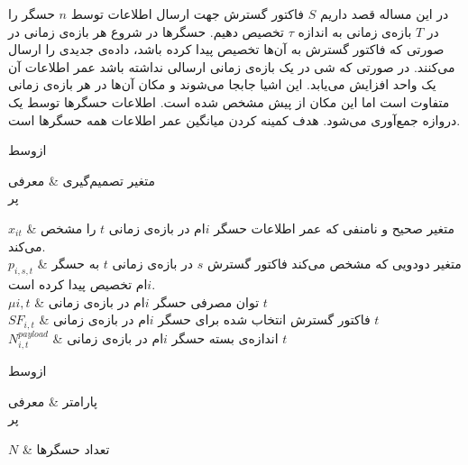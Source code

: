 

در این مساله قصد داریم $S$ فاکتور گسترش جهت ارسال اطلاعات توسط $n$ حسگر را در $T$ بازه‌ی زمانی به اندازه $\tau$ تخصیص دهیم.
حسگرها در شروع هر بازه‌ی زمانی در صورتی که فاکتور گسترش به آن‌ها تخصیص پیدا کرده باشد، داده‌ی جدیدی را ارسال می‌کنند.
در صورتی که شی در یک بازه‌ی زمانی ارسالی نداشته باشد عمر اطلاعات آن یک واحد افزایش می‌یابد.
این اشیا جابجا می‌شوند و مکان آن‌ها در هر بازه‌ی زمانی متفاوت است اما این مکان از پیش مشخص شده است.
اطلاعات حسگر‌ها توسط یک دروازه جمع‌آوری می‌شود.
هدف کمینه کردن میانگین عمر اطلاعات همه حسگر‌ها است.


‌ازوسط



متغیر تصمیم‌گیری & معرفی \\

‌پر

$x_{it}$ & متغیر صحیح و نامنفی که عمر اطلاعات حسگر $i$ام در بازه‌ی زمانی $t$ را مشخص می‌کند. \\

$p_{i,s,t}$ & متغیر دودویی که مشخص می‌کند فاکتور گسترش $s$ در بازه‌ی زمانی $t$ به حسگر $i$ام تخصیص پیدا کرده است. \\

$\mu{i,t}$ & توان مصرفی حسگر $i$ام در بازه‌ی زمانی $t$ \\

$SF_{i,t}$ & فاکتور گسترش انتخاب شده برای حسگر $i$ام در بازه‌ی زمانی $t$ \\

$N^{payload}_{i,t}$ & اندازه‌ی بسته حسگر $i$ام در بازه‌ی زمانی $t$ \\





‌ازوسط



پارامتر & معرفی \\

‌پر

$N$ & تعداد حسگرها \\

